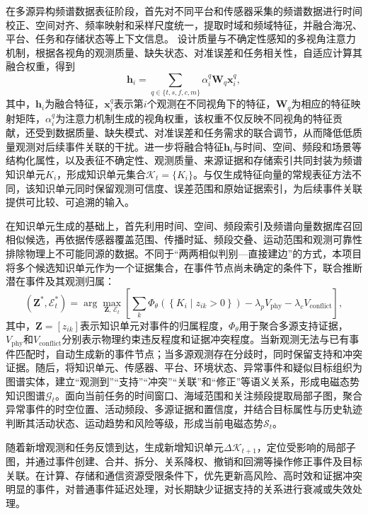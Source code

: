 在多源异构频谱数据表征阶段，首先对不同平台和传感器采集的频谱数据进行时间校正、空间对齐、频率映射和采样尺度统一，提取时域和频域特征，并融合海况、平台、任务和存储状态等上下文信息。
设计质量与不确定性感知的多视角注意力机制，根据各视角的观测质量、缺失状态、对准误差和任务相关性，自适应计算其融合权重，得到
\begin{equation}
\boldsymbol{h}_{i}=\sum_{q\in\{t,s,f,c,m\}}
\alpha_{i}^{q}
\boldsymbol{W}_{q}
\boldsymbol{x}_{i}^{q},
\end{equation}
其中，$\boldsymbol{h}_{i}$为融合特征，$\boldsymbol{x}_{i}^{q}$表示第$i$个观测在不同视角下的特征，$\boldsymbol{W}_{q}$为相应的特征映射矩阵，$\alpha_i^q$为注意力机制生成的视角权重，该权重不仅反映不同视角的特征贡献，还受到数据质量、缺失模式、对准误差和任务需求的联合调节，从而降低低质量观测对后续事件关联的干扰。进一步将融合特征$\boldsymbol{h}_{i}$与时间、空间、频段和场景等结构化属性，以及表征不确定性、观测质量、来源证据和存储索引共同封装为频谱知识单元$K_i$，形成知识单元集合$\mathcal{K}_{t}=\{K_i\}$。与仅生成特征向量的常规表征方法不同，该知识单元同时保留观测可信度、误差范围和原始证据索引，为后续事件关联提供可比较、可追溯的输入。

在知识单元生成的基础上，首先利用时间、空间、频段索引及频谱向量数据库召回相似候选，再依据传感器覆盖范围、传播时延、频段交叠、运动范围和观测可靠性排除物理上不可能同源的数据。不同于“两两相似判别—直接建边”的方式，本项目将多个候选知识单元作为一个证据集合，在事件节点尚未确定的条件下，联合推断潜在事件及其观测归属：
\begin{equation}
\left(
\boldsymbol{Z}^{*},
\mathcal{E}_{t}^{*}
\right)
=
\arg\max_{\boldsymbol{Z},\,\mathcal{E}_{t}}
\left[
\sum_{k}
\Phi_{\theta}
\left(
\left\{
K_i
\mid
z_{ik}>0
\right\}
\right)
-
\lambda_{p}V_{\mathrm{phy}}
-
\lambda_{c}V_{\mathrm{conflict}}
\right],
\end{equation}
其中，$\boldsymbol{Z}=[z_{ik}]$表示知识单元对事件的归属程度，$\Phi_{\theta}$用于聚合多源支持证据，$V_{\mathrm{phy}}$和$V_{\mathrm{conflict}}$分别表示物理约束违反程度和证据冲突程度。当新观测无法与已有事件匹配时，自动生成新的事件节点；当多源观测存在分歧时，同时保留支持和冲突证据。随后，将知识单元、传感器、平台、环境状态、异常事件和疑似目标组织为图谱实体，建立“观测到”“支持”“冲突”“关联”和“修正”等语义关系，形成电磁态势知识图谱$\mathcal{G}_{t}$。面向当前任务的时间窗口、海域范围和关注频段提取局部子图，聚合异常事件的时空位置、活动频段、多源证据和置信度，并结合目标属性与历史轨迹判断其活动状态、运动趋势和风险等级，形成当前电磁态势$\mathcal{S}_{t}$。

随着新增观测和任务反馈到达，生成新增知识单元$\Delta\mathcal{K}_{t+1}$，定位受影响的局部子图，并通过事件创建、合并、拆分、关系降权、撤销和回溯等操作修正事件及目标关联。在计算、存储和通信资源受限条件下，优先更新高风险、高时效和证据冲突明显的事件，对普通事件延迟处理，对长期缺少证据支持的关系进行衰减或失效处理。

